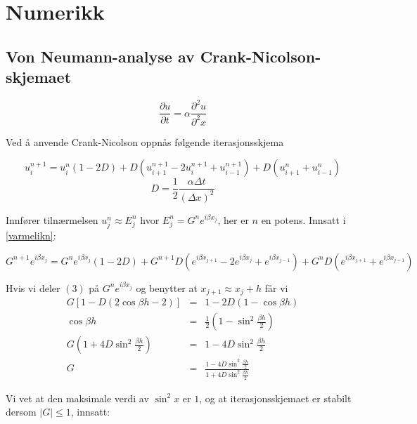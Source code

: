\chapter{Numerikk}

\section{Von Neumann-analyse av Crank-Nicolson-skjemaet}

\begin{equation}
\frac{\partial u}{\partial t} = \alpha\frac{\partial^2u}{\partial^2x}
\label{varmelikn}
\end{equation}

\noindent Ved å anvende Crank-Nicolson oppnås følgende iterasjonsskjema

\begin{equation}
u_i^{n+1} = u_i^n\left(1-2D\right)+D\left(u_{i+1}^{n+1}-2u_i^{n+1}+u_{i-1}^{n+1}\right) + D\left(u_{i+1}^n + u_{i-1}^n\right)
\end{equation}
\begin{equation}
D = \frac{1}{2}\frac{\alpha\Delta t}{(\Delta x)^2}
\end{equation}

\noindent Innfører tilnærmelsen $u_j^n \approx E_j^n$ hvor $E_j^n = G^ne^{i\beta
x_j}$, her er $n$ en potens. Innsatt i \cref{varmelikn}:

\begin{equation*}
G^{n+1}e^{i\beta x_j} = G^ne^{i\beta x_j}\left(1-2D\right) + G^{n+1}D\left(e^{i\beta x_{j+1}} - 2e^{i\beta x_j} + e^{i\beta x_{j-1}}\right) + G^nD\left(e^{i\beta x_{j+1}} + e^{i\beta x_{j-1}}\right)
\end{equation*}

\noindent Hvis vi deler $(3)$ på $G^ne^{i\beta x_j}$ og benytter at $x_{j+1} \approx x_j + h$ får vi
\begin{eqnarray*}
G\left[1-D\left(2\cos{\beta h} - 2\right)\right] &=& 1 - 2D\left(1-\cos{\beta h}\right) \\
\cos{\beta h} &=& \frac{1}{2}\left(1-\sin^2{\frac{\beta h}{2}}\right) \\
G\left(1+4D\sin^{2}{\frac{\beta h}{2}}\right) &=& 1 - 4D\sin^2{\frac{\beta h}{2}} \\
G &=& \frac{1-4D\sin^2{\frac{\beta h}{2}}}{1+4D\sin^2{\frac{\beta h}{2}}}
\end{eqnarray*}

\noindent Vi vet at den maksimale verdi av $\sin^2{x}$ er $1$, og at iterasjonsskjemaet er stabilt dersom $|G| \le 1$, innsatt:


